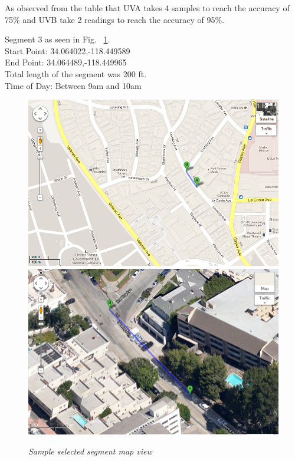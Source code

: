 \documentclass[12pt,fullpage,doublespace]{article}
\begin{document}
As observed from the table that UVA takes 4 samples to reach the accuracy of 75\% and UVB take 2 readings to reach the accuracy of 95\%. 
\newpage\newpage
\begin{center}
Segment 3 as seen in Fig. ~\ref{fig:segment3}. \\
Start Point: 34.064022,-118.449589\\
End Point:  34.064489,-118.449965 \\
Total length of the segment was 200 ft.\\
Time of Day: Between 9am and 10am\\
\begin{figure}[h]
\begin{center}
\includegraphics[scale=0.32]{segment3a.png}
\includegraphics[scale=0.32]{segment3b.png}
\caption{\small \sl Sample selected segment map view}\label{fig:segment3}
\end{center}
\end{figure}
\end{center}
\end{document}
